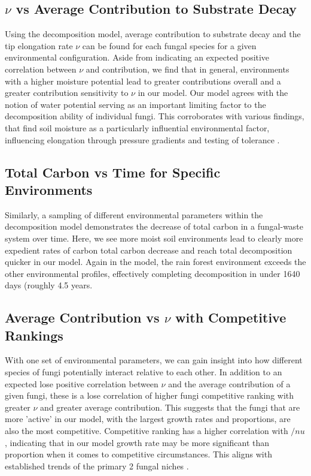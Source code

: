 \documentclass[12pt]{article}
\begin{document}
\begin{multicols}{2}
\subsection{$\nu$ vs Average Contribution to Substrate Decay} %
Using the decomposition model, average contribution to substrate decay and the tip elongation rate $\nu$ can be found for each fungal species for a given environmental configuration. Aside from indicating an expected positive correlation between $\nu$ and contribution, we find that in general, environments with a higher moisture potential lead to greater contributions overall and a greater contribution sensitivity to $\nu$ in our model. Our model agrees with the notion of water potential serving as an important limiting factor to the decomposition ability of individual fungi. This corroborates with various findings, that find soil moisture as a particularly influential environmental factor, influencing elongation through pressure gradients and testing of tolerance \cite{Maynard2019} \cite{Lustenhouwer2020}. %

\subsection{Total Carbon vs Time for Specific Environments} %
Similarly, a sampling of different environmental parameters within the decomposition model demonstrates the decrease of total carbon in a fungal-waste system over time. Here, we see more moist soil environments lead to clearly more expedient rates of carbon total carbon decrease and reach total decomposition quicker in our model. Again in the model, the rain forest environment exceeds the other environmental profiles, effectively completing decomposition in under 1640 days (roughly 4.5 years.

\subsection{Average Contribution vs $\nu$ with Competitive Rankings} %
With one set of environmental parameters, we can gain insight into how different species of fungi potentially interact relative to each other. In addition to an expected lose positive correlation between $\nu$ and the average contribution of a given fungi, these is a lose correlation of higher fungi competitive ranking with greater $\nu$ and greater average contribution. This suggests that the fungi that are more 'active' in our model, with the largest growth rates and proportions, are also the most competitive. Competitive ranking has a higher correlation with $/nu$, indicating that in our model growth rate may be more significant than proportion when it comes to competitive circumstances. This aligns with established trends of the primary 2 fungal niches \cite{Maynard2019}.


\end{multicols}
\end{document}

